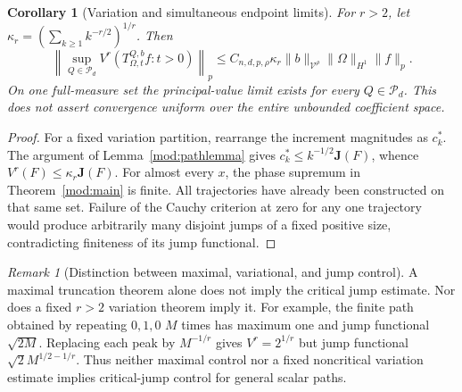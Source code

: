 \documentclass[11pt]{article}
\numberwithin{equation}{section}
\newtheorem{corollary}[theorem]{Corollary}
\theoremstyle{remark}
\newtheorem{remark}[theorem]{Remark}
\theoremstyle{definition}
\newcommand{\norm}[1]{\lVert #1\rVert}
\newcommand{\JJ}{\mathbf J}
\newcommand{\PP}{\mathcal P}
\begin{document}
\begin{corollary}[Variation and simultaneous endpoint limits]\label{mod:variation-limits}
For $r>2$, let
$\kappa_r=(\sum_{k\ge1}k^{-r/2})^{1/r}$. Then
\[
 \left\|\sup_{Q\in\PP_d}V^r(T_{\Omega,t}^{Q,b}f:t>0)\right\|_p
 \le C_{n,d,p,\rho}\kappa_r\|b\|_{\mathcal V^\rho}\|\Omega\|_{H^1}\norm f_p.
\]
On one full-measure set the principal-value limit exists for every
$Q\in\PP_d$. This does not assert convergence uniform over the entire
unbounded coefficient space.
\end{corollary}
\begin{proof}
For a fixed variation partition, rearrange the increment magnitudes as
$c_k^*$. The argument of Lemma~\ref{mod:pathlemma} gives
$c_k^*\le k^{-1/2}\JJ(F)$, whence $V^r(F)\le\kappa_r\JJ(F)$.
For almost every $x$, the phase supremum in Theorem~\ref{mod:main} is
finite. All trajectories have already been constructed on that same
set. Failure of the Cauchy criterion at zero for any one trajectory
would produce arbitrarily many disjoint jumps of a fixed positive
size, contradicting finiteness of its jump functional.
\end{proof}

\begin{remark}[Distinction between maximal, variational, and jump control]\label{mod:nonimplications}
A maximal truncation theorem alone does not imply the critical jump
estimate. Nor does a fixed $r>2$ variation theorem imply it. For example,
the finite path obtained by repeating $0,1,0$ $M$ times has maximum one
and jump functional $\sqrt{2M}$. Replacing each peak by $M^{-1/r}$ gives
$V^r=2^{1/r}$ but jump functional $\sqrt2M^{1/2-1/r}$. Thus neither maximal control nor a fixed noncritical variation estimate
implies critical-jump control for general scalar paths.
\end{remark}
\end{document}

